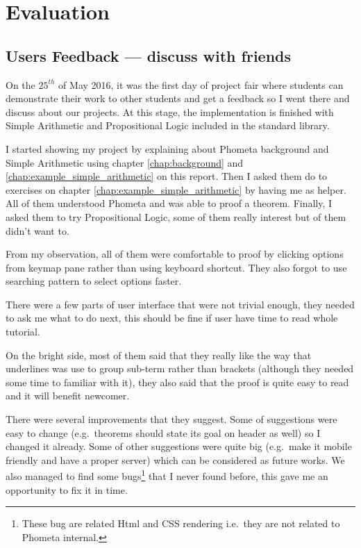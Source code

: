 \documentclass[master.tex]{subfiles}
\begin{document}
\chapter{Evaluation}

\section{Users Feedback --- discuss with friends}

On the $25^{th}$ of May 2016, it was the first day of project fair where
students can demonstrate their work to other students and get a feedback so I
went there and discuss about our projects. At this stage, the implementation is
finished with Simple Arithmetic and Propositional Logic included in the standard library.

I started showing my project by explaining about Phometa background and Simple
Arithmetic using chapter \ref{chap:background} and
\ref{chap:example_simple_arithmetic} on this report. Then I asked them do to
exercises on chapter \ref{chap:example_simple_arithmetic} by having me as
helper. All of them understood Phometa and was able to proof a theorem. Finally,
I asked them to try Propositional Logic, some of them really interest but of
them didn't want to.

From my observation, all of them were comfortable to proof by clicking options
from keymap pane rather than using keyboard shortcut. They also forgot to use
searching pattern to select options faster.

There were a few parts of user interface that were not trivial enough, they
needed to ask me what to do next, this should be fine if user have time to read
whole tutorial.

On the bright side, most of them said that they really like the way that
underlines was use to group sub-term rather than brackets (although they needed
some time to familiar with it), they also said that the proof is quite easy to
read and it will benefit newcomer.

There were several improvements that they suggest. Some of suggestions
were easy to change (e.g.\ theorems should state its goal on header as well) so
I changed it already. Some of other suggestions were quite big (e.g.\ make it
mobile friendly and have a proper server) which can be considered as future
works. We also managed to find some bugs\footnote{These bug are
  related Html and CSS rendering i.e.\ they are not related to Phometa internal.} that I never found before,
this gave me an opportunity to fix it in time.
\end{document}
